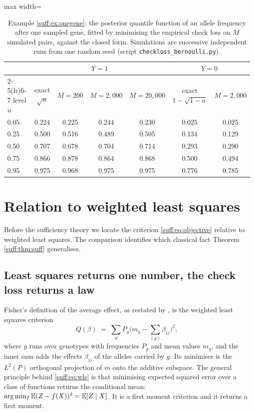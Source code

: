 \begin{table}[t]
\centering
\begin{adjustbox}{max width=\textwidth}
\begin{tabular}{lcccccc}
\toprule
& \multicolumn{4}{c}{$Y=1$} & \multicolumn{2}{c}{$Y=0$} \\
\cmidrule(lr){2-5}\cmidrule(lr){6-7}
level $u$ & exact $\sqrt u$ & $M=200$ & $M=2{,}000$ & $M=20{,}000$ & exact $1-\sqrt{1-u}$ & $M=2{,}000$ \\
\midrule
0.05 & 0.224 & 0.225 & 0.244 & 0.230 & 0.025 & 0.025 \\
0.25 & 0.500 & 0.516 & 0.489 & 0.505 & 0.134 & 0.129 \\
0.50 & 0.707 & 0.678 & 0.704 & 0.714 & 0.293 & 0.290 \\
0.75 & 0.866 & 0.878 & 0.864 & 0.868 & 0.500 & 0.494 \\
0.95 & 0.975 & 0.968 & 0.975 & 0.975 & 0.776 & 0.785 \\
\bottomrule
\end{tabular}
\end{adjustbox}
\caption{Example \ref{suff:ex:onegene}: the posterior quantile function of an allele
frequency after one sampled gene, fitted by minimising the empirical check loss on $M$
simulated pairs, against the closed form. Simulations are successive independent runs from one random
seed (script \texttt{checkloss\_bernoulli.py}).}
\label{suff:tab:onegene}
\end{table}

\section{Relation to weighted least squares}
\label{suff:sec:wls}

Before the sufficiency theory we locate the criterion \eqref{suff:eq:objective} relative to
weighted least squares. The comparison identifies which classical fact Theorem
\ref{suff:thm:suff} generalises.

\subsection{Least squares returns one number, the check loss returns a law}

Fisher's definition of the average effect, as restated by \citet[Equation 10]{suff:ewens2024},
is the weighted least squares criterion
\begin{equation}
Q(\beta) \;=\; \sum_g P_g\Big(m_g-\sum_{(g)}\beta_{ij}\Big)^2 ,
\label{suff:eq:wls}
\end{equation}
where $g$ runs over genotypes with frequencies $P_g$ and mean values $m_g$, and the inner sum
adds the effects $\beta_{ij}$ of the alleles carried by $g$. Its minimiser is the $L^2(P)$
orthogonal projection of $m$ onto the additive subspace. The general principle behind
\eqref{suff:eq:wls} is that minimising expected squared error over a class of functions
returns the conditional mean: $\arg\min_f\mathbb{E}(Z-f(X))^2 = \mathbb{E}[Z\mid X]$. It is a first moment
criterion and it returns a first moment.

